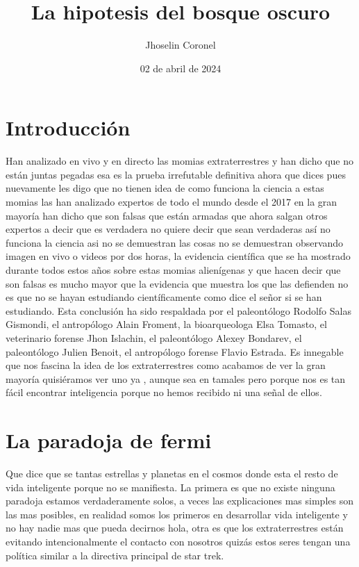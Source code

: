 \documentclass[12pt a4paper]{article}
\title{La hipotesis del bosque oscuro}
\author{Jhoselin Coronel}
\date{02 de abril de 2024}
\begin{document}
\maketitle
\section{Introducción}
Han analizado en vivo y en directo las momias extraterrestres y han dicho que no están juntas pegadas esa es la prueba irrefutable definitiva ahora que dices pues nuevamente les digo que no tienen idea de como funciona la ciencia a estas momias las han analizado expertos de todo el mundo desde el 2017 en la gran mayoría han dicho que son falsas que están armadas que ahora salgan otros expertos a decir que es verdadera no quiere decir que sean verdaderas así no funciona la ciencia asi no se demuestran las cosas no se demuestran observando imagen en vivo o videos por dos horas, la evidencia científica que se ha mostrado durante todos estos años  sobre estas momias alienígenas y que hacen decir que son falsas es mucho mayor que la evidencia que muestra los que las defienden no es que no se hayan estudiando científicamente como dice el señor si se han estudiando. Esta conclusión ha sido respaldada por el paleontólogo Rodolfo Salas Gismondi, el antropólogo Alain Froment, la bioarqueologa Elsa Tomasto, el veterinario forense Jhon Islachin, el paleontólogo Alexey Bondarev, el paleontólogo Julien Benoit, el antropólogo forense Flavio Estrada. 
Es innegable que nos fascina la idea de los extraterrestres como acabamos de ver la gran mayoría quisiéramos ver uno ya , aunque sea en tamales pero porque nos es tan fácil encontrar inteligencia porque no hemos recibido ni una señal de ellos.

\section{La paradoja de fermi}
Que dice que se tantas estrellas y planetas en el cosmos donde esta el resto de vida inteligente porque no se manifiesta. La primera es que no existe ninguna paradoja estamos verdaderamente solos, a veces las explicaciones mas simples son las mas posibles, en realidad somos los primeros en desarrollar vida inteligente y no hay nadie mas que pueda decirnos hola, otra es que los extraterrestres están evitando intencionalmente el contacto con nosotros quizás estos seres tengan una política similar a la directiva principal de star trek.
\end{document}
